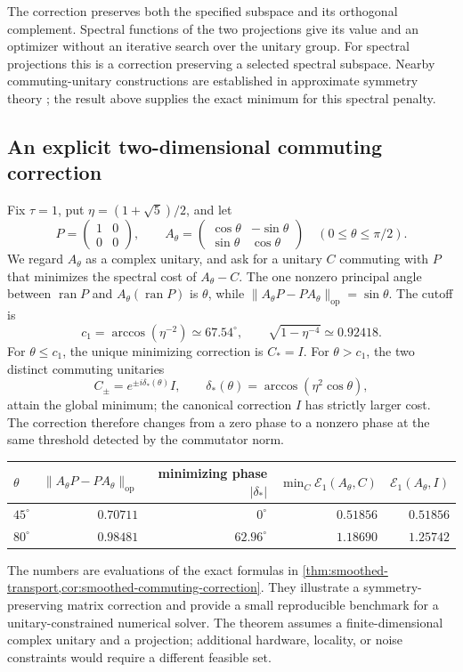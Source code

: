 The correction preserves both the specified subspace and its orthogonal
complement. Spectral functions of the two projections give its value and
an optimizer without an iterative search over the unitary group.
For spectral projections this is a correction preserving a selected
spectral subspace. Nearby commuting-unitary constructions are established
in approximate symmetry theory \citep{chubb2017approximate}; the result
above supplies the exact minimum for this spectral penalty.

\subsection{An explicit two-dimensional commuting correction}
\label{sec:smoothed-worked-example}

Fix $\tau=1$, put $\eta=(1+\sqrt5)/2$, and let
\[
 P=\begin{pmatrix}1&0\\0&0\end{pmatrix},\qquad
 A_\theta=\begin{pmatrix}\cos\theta&-\sin\theta\\
                              \sin\theta&\cos\theta\end{pmatrix}
 \quad (0\leq\theta\leq\pi/2).
\]
We regard $A_\theta$ as a complex unitary, and ask for a unitary $C$
commuting with $P$ that minimizes the spectral cost of $A_\theta-C$.
The one nonzero principal angle between $\operatorname{ran}P$ and
$A_\theta(\operatorname{ran}P)$ is $\theta$, while
$\|A_\theta P-PA_\theta\|_{\mathrm{op}}=\sin\theta$.
The cutoff is
\[
 c_1=\arccos(\eta^{-2})\simeq67.54^\circ,
 \qquad \sqrt{1-\eta^{-4}}\simeq0.92418.
\]
For $\theta\leq c_1$, the unique minimizing correction is $C_*=I$.
For $\theta>c_1$, the two distinct commuting unitaries
\[
 C_\pm=e^{\pm i\delta_*(\theta)}I,
 \qquad\delta_*(\theta)=\arccos(\eta^2\cos\theta),
\]
attain the global minimum; the canonical correction $I$ has strictly
larger cost. The correction therefore changes from a zero phase to a
nonzero phase at the same threshold detected by the commutator norm.

\begin{center}
\small
\begin{tabular}{@{}lrrrr@{}}
\toprule
$\theta$ & $\|A_\theta P-PA_\theta\|_{\mathrm{op}}$
 & minimizing phase $|\delta_*|$
 & $\min_C\mathcal E_1(A_\theta,C)$ & $\mathcal E_1(A_\theta,I)$ \\
\midrule
$45^\circ$ & $0.70711$ & $0^\circ$ & $0.51856$ & $0.51856$ \\
$80^\circ$ & $0.98481$ & $62.96^\circ$ & $1.18690$ & $1.25742$ \\
\bottomrule
\end{tabular}
\end{center}

The numbers are evaluations of the exact formulas in
\cref{thm:smoothed-transport,cor:smoothed-commuting-correction}.
They illustrate a symmetry-preserving matrix correction and provide a
small reproducible benchmark for a unitary-constrained numerical solver.
The theorem assumes a finite-dimensional complex unitary and a projection;
additional hardware, locality, or noise constraints would require a
different feasible set.
